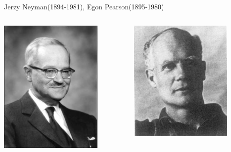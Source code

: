 \documentclass[aspectratio=169]{beamer}
\begin{document}
\begin{frame}{Jerzy Neyman(1894-1981), Egon Pearson(1895-1980)}
  \begin{columns}
    \begin{column}{0.5\linewidth}
      \includegraphics[width=5cm]{0692_03}
    \end{column}
    \begin{column}{0.5\linewidth}
      \includegraphics[width=5cm]{Pearson_Egon_2}
    \end{column}
  \end{columns}
\end{frame}
\end{document}
